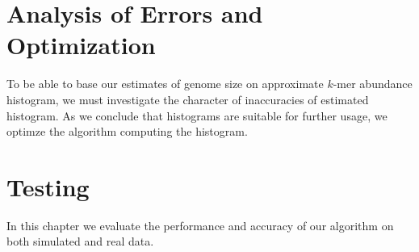 \chapter{Analysis of Errors and Optimization}

To be able to base our estimates of genome size on approximate $k$-mer abundance histogram,
we must investigate the character of inaccuracies of estimated histogram. As we conclude
that histograms are suitable for further usage, we optimze the algorithm computing the histogram. 

\chapter{Testing}

In this chapter we evaluate the performance and accuracy of our algorithm on both simulated
and real data.
